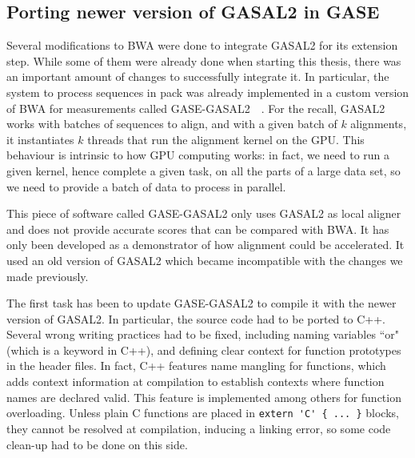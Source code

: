 \subsection{Porting newer version of GASAL2 in GASE}

Several modifications to BWA were done to integrate GASAL2 for its extension step. While some of them were already done when starting this thesis, there was an important amount of changes to successfully integrate it. In particular, the system to process sequences in pack was already implemented in a custom version of BWA for measurements called GASE-GASAL2~\cite{Ahmed:gase-gasal2}~\cite{Ahmed:GASE}. For the recall, GASAL2 works with batches of sequences to align, and with a given batch of $k$ alignments, it instantiates $k$ threads that run the alignment kernel on the GPU. This behaviour is intrinsic to how GPU computing works: in fact, we need to run a given kernel, hence complete a given task, on all the parts of a large data set, so we need to provide a batch of data to process in parallel.

This piece of software called GASE-GASAL2 only uses GASAL2 as local aligner and does not provide accurate scores that can be compared with BWA. It has only been developed as a demonstrator of how alignment could be accelerated. It used an old version of GASAL2 which became incompatible with the changes we made previously.

The first task has been to update GASE-GASAL2 to compile it with the newer version of GASAL2. In particular, the source code had to be ported to C++. Several wrong writing practices had to be fixed, including naming variables ``or" (which is a keyword in C++), and defining clear context for function prototypes in the header files. In fact, C++ features name mangling for functions, which adds context information at compilation to establish contexts where function names are declared valid. This feature is implemented among others for function overloading. Unless plain C functions are placed in \verb|extern 'C' { ... }| blocks, they cannot be resolved at compilation, inducing a linking error, so some code clean-up had to be done on this side.